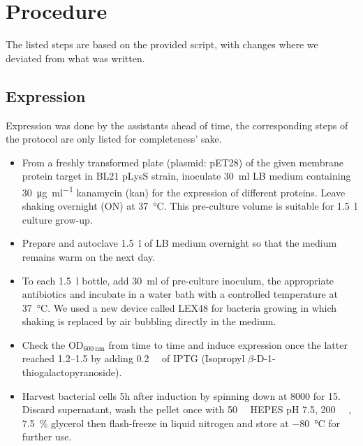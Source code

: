 \documentclass[a4paper]{scrreprt}
\title{\mytitle{}}
\author{Michael Senn \maillink{michael.senn@students.unibe.ch} - 16-126-880}
\date{\printdate}
\begin{document}
\maketitle

\chapter{Procedure}

The listed steps are based on the provided script, with changes where we
deviated from what was written.

\section{Expression}

Expression was done by the assistants ahead of time, the corresponding steps of
the protocol are only listed for completeness' sake.

\begin{itemize}
	\item From a freshly transformed plate (plasmid: pET28) of the given
		membrane protein target in BL21 pLysS strain, inoculate
		\SI{30}{\ml} LB medium containing \SI{30}{\ug \per \ml}
		kanamycin (kan) for the expression of different proteins. Leave
		shaking overnight (ON) at \SI{37}{\celsius}. This pre-culture
		volume is suitable for \SI{1.5}{\l} culture grow-up.

	\item Prepare and autoclave \SI{1.5}{\l} of LB medium overnight so that
		the medium remains warm on the next day.

	\item To each \SI{1.5}{\l} bottle, add \SI{30}{\ml} of pre-culture
		inoculum, the appropriate antibiotics and incubate in a water
		bath with a controlled temperature at \SI{37}{\celsius}. We
		used a new device called LEX48 for bacteria growing in which
		shaking is replaced by air bubbling directly in the medium.

	\item Check the OD$_{\SI{600}{\nm}}$ from time to time and induce
		expression once the latter reached \numrange{1.2}{1.5} by adding
		\SI{0.2}{\milli\Molar} of IPTG (Isopropyl
		$\beta$-D-1-thiogalactopyranoside).

	\item Harvest bacterial cells 5h after induction by spinning down at
		\SI{8000}{\rpm} for \SI{15}{\min}. Discard supernatant, wash
		the pellet once with \SI{50}{\milli\Molar} HEPES pH 7.5,
		\SI{200}{\milli\Molar} , \SI{7.5}{\percent} glycerol
		then flash-freeze in liquid nitrogen and store at
		\SI{-80}{\celsius} for further use.
\end{itemize}
\end{document}
